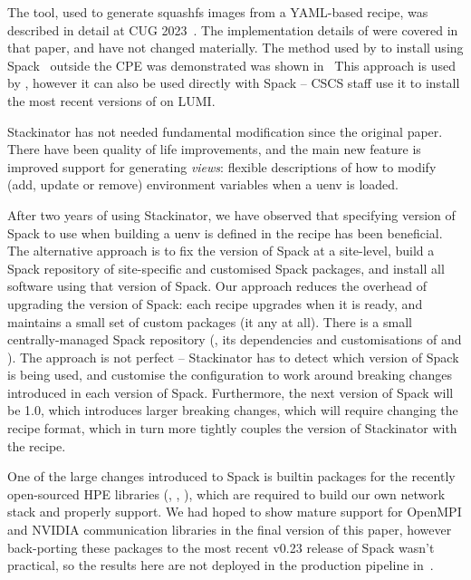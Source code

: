 The  \stackinator tool, used to generate squashfs images from a YAML-based recipe, was described in detail at CUG 2023~\cite{uenv2023}.
The implementation details of \stackinator were covered in that paper, and have not changed materially.
The method used by \stackinator to install \craympich using Spack~\cite{gamblin:sc15} outside the CPE was demonstrated was shown in~\cite{uenv2023}
This approach is used by \stackinator, however it can also be used directly with Spack -- CSCS staff use it to install the most recent versions of \craympich on LUMI.

Stackinator has not needed fundamental modification since the original paper.
There have been quality of life improvements, and the main new feature is improved support for generating \emph{views}: flexible descriptions of how to modify (add, update or remove) environment variables when a uenv is loaded.

After two years of using Stackinator, we have observed that specifying version of Spack to use when building a uenv is defined in the recipe has been beneficial.
The alternative approach is to fix the version of Spack at a site-level, build a Spack repository of site-specific and customised Spack packages, and install all software using that version of Spack.
Our approach reduces the overhead of upgrading the version of Spack: each recipe upgrades when it is ready, and maintains a small set of custom packages (it any at all).
There is a small centrally-managed Spack repository (, its dependencies and customisations of  and ).
The approach is not perfect -- Stackinator has to detect which version of Spack is being used, and customise the configuration to work around breaking changes introduced in each version of Spack.
Furthermore, the next version of Spack will be 1.0, which introduces larger breaking changes, which will require changing the recipe format, which in turn more tightly couples the version of Stackinator with the recipe.

One of the large changes introduced to Spack is builtin packages for the recently open-sourced HPE \slingshot libraries (, , ), which are required to build our own network stack and properly support.
We had hoped to show mature support for OpenMPI and NVIDIA communication libraries in the final version of this paper, however back-porting these packages to the most recent v0.23 release of Spack wasn't practical, so the results here are not deployed in the production pipeline in~.

